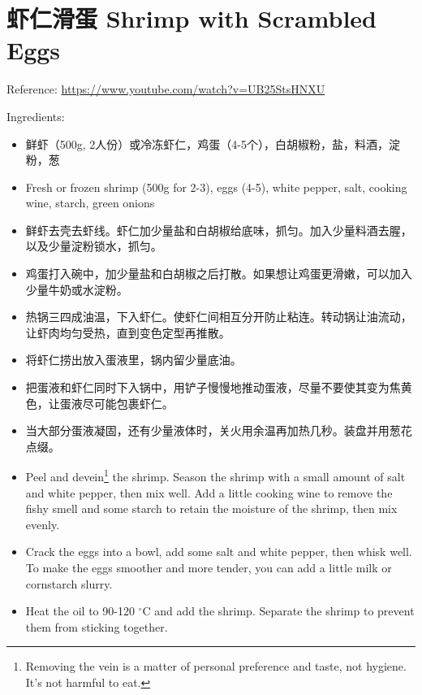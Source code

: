 \documentclass{article}
\newcommand{\chn}[1]{\foreignlanguage{chinese-simplified}{#1}}
\begin{document}
\section{\chn{虾仁滑蛋} Shrimp with Scrambled Eggs}
Reference: \url{https://www.youtube.com/watch?v=UB25StsHNXU}

Ingredients: 
\begin{itemize}
    \item \chn{鲜虾（500g, 2人份）或冷冻虾仁，鸡蛋（4-5个），白胡椒粉，盐，料酒，淀粉，葱}
    \item Fresh or frozen shrimp (500g for 2-3), eggs (4-5), white pepper, salt, cooking wine, starch, green onions
\end{itemize}
\begin{paracol}{2}
    \begin{itemize}
        \item \chn{鲜虾去壳去虾线。虾仁加少量盐和白胡椒给底味，抓匀。加入少量料酒去腥，以及少量淀粉锁水，抓匀。}
        \item \chn{鸡蛋打入碗中，加少量盐和白胡椒之后打散。如果想让鸡蛋更滑嫩，可以加入少量牛奶或水淀粉。}
        \item \chn{热锅三四成油温，下入虾仁。使虾仁间相互分开防止粘连。转动锅让油流动，让虾肉均匀受热，直到变色定型再推散。}
        \item \chn{将虾仁捞出放入蛋液里，锅内留少量底油。}
        \item \chn{把蛋液和虾仁同时下入锅中，用铲子慢慢地推动蛋液，尽量不要使其变为焦黄色，让蛋液尽可能包裹虾仁。}
        \item \chn{当大部分蛋液凝固，还有少量液体时，关火用余温再加热几秒。装盘并用葱花点缀。}
    \end{itemize}
    \switchcolumn
    \begin{itemize}
        \item Peel and devein\footnote{Removing the vein is a matter of personal preference and taste, not hygiene. It's not harmful to eat.} the shrimp. 
        Season the shrimp with a small amount of salt and white pepper, then mix well. 
        Add a little cooking wine to remove the fishy smell and some starch to retain the moisture of the shrimp, then mix evenly. 
        \item Crack the eggs into a bowl, add some salt and white pepper, then whisk well.
        To make the eggs smoother and more tender, you can add a little milk or cornstarch slurry.
        \item Heat the oil to 90-120 $^{\circ}$C and add the shrimp. 
        Separate the shrimp to prevent them from sticking together. 

\end{itemize}
\end{paracol}
\end{document}
